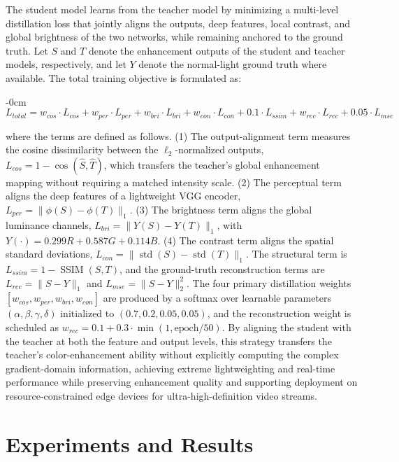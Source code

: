 \documentclass[sensors,article,submit,moreauthors]{Definitions/mdpi}
\begin{document}
The student model learns from the teacher model by minimizing a multi-level distillation loss that jointly aligns the outputs, deep features, local contrast, and global brightness of the two networks, while remaining anchored to the ground truth. Let $S$ and $T$ denote the enhancement outputs of the student and teacher models, respectively, and let $Y$ denote the normal-light ground truth where available. The total training objective is formulated as:

\begin{adjustwidth}{-\extralength}{0cm}
\begin{equation}
L_{total} = w_{cos}\cdot L_{cos} + w_{per}\cdot L_{per} + w_{bri}\cdot L_{bri} + w_{con}\cdot L_{con} + 0.1\cdot L_{ssim} + w_{rec}\cdot L_{rec} + 0.05\cdot L_{mse}
\end{equation}
\end{adjustwidth}

where the terms are defined as follows. (1) The output-alignment term measures the cosine dissimilarity between the $\ell_2$-normalized outputs, $L_{cos} = 1 - \cos(\hat{S}, \hat{T})$, which transfers the teacher's global enhancement mapping without requiring a matched intensity scale. (2) The perceptual term aligns the deep features of a lightweight VGG encoder, $L_{per} = \|\phi(S) - \phi(T)\|_1$. (3) The brightness term aligns the global luminance channels, $L_{bri} = \|Y(S) - Y(T)\|_1$, with $Y(\cdot) = 0.299R + 0.587G + 0.114B$. (4) The contrast term aligns the spatial standard deviations, $L_{con} = \|\operatorname{std}(S) - \operatorname{std}(T)\|_1$. The structural term is $L_{ssim} = 1 - \operatorname{SSIM}(S, T)$, and the ground-truth reconstruction terms are $L_{rec} = \|S - Y\|_1$ and $L_{mse} = \|S - Y\|_2^2$. The four primary distillation weights $[w_{cos}, w_{per}, w_{bri}, w_{con}]$ are produced by a softmax over learnable parameters $(\alpha, \beta, \gamma, \delta)$ initialized to $(0.7, 0.2, 0.05, 0.05)$, and the reconstruction weight is scheduled as $w_{rec} = 0.1 + 0.3\cdot\min(1, \mathrm{epoch}/50)$. By aligning the student with the teacher at both the feature and output levels, this strategy transfers the teacher's color-enhancement ability without explicitly computing the complex gradient-domain information, achieving extreme lightweighting and real-time performance while preserving enhancement quality and supporting deployment on resource-constrained edge devices for ultra-high-definition video streams.

\section{Experiments and Results}
\end{document}
